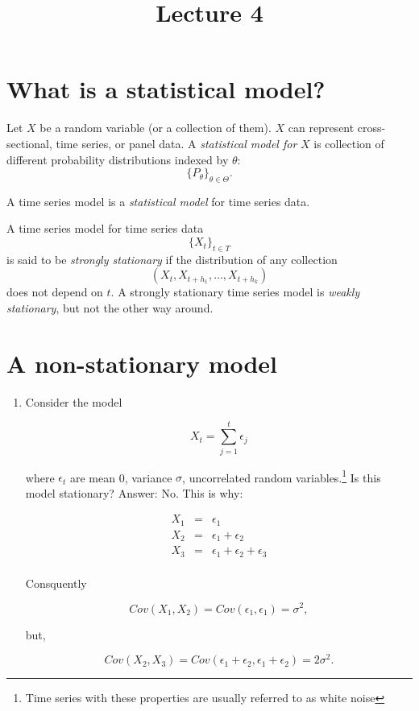 \documentclass[12] {article}
\begin{document}
\onehalfspace

\title{Lecture 4}
\date{}
\maketitle

\section{What is a statistical model?}


Let $X$ be a random variable (or a collection of them). $X$ can represent cross-sectional, time series, or panel data. A \emph{statistical model for} $X$ is collection of different probability distributions indexed by $\theta$: 
\[ \{P_{\theta}\}_{\theta \in \Theta}. \] 

\noindent A time series model is a \emph{statistical model} for time series data. 

A time series model for time series data
\[ \{X_t\}_{t \in T} \]
is said to be \emph{strongly stationary} if the distribution of any collection 
\[ (X_{t}, X_{t+h_1}, \ldots, X_{t+h_k}) \]
does not depend on $t$.
A strongly stationary time series model is \emph{weakly stationary}, but not the other way around.  


\section{A non-stationary model}

\begin{enumerate}

\item Consider the model 

\[ X_t = \sum_{j=1}^{t} \epsilon_j \]

where $\epsilon_t$ are mean 0, variance $\sigma$, uncorrelated random variables.\footnote{Time series with these properties are usually referred to as white noise} Is this model stationary? Answer: No. This is why:

\begin{eqnarray*}
X_1&=&\epsilon_1 \\
X_2&=& \epsilon_1+ \epsilon_2 \\
X_3&=& \epsilon_1 + \epsilon_2 + \epsilon_3 \\
\end{eqnarray*}

Consquently

\[ Cov(X_1,X_2) = Cov(\epsilon_1,\epsilon_1) = \sigma^2, \]

but,

\[ Cov(X_2,X_3) = Cov(\epsilon_1+\epsilon_2,\epsilon_1+\epsilon_2) = 2 \sigma^2. \]

\end{enumerate}
\end{document}
